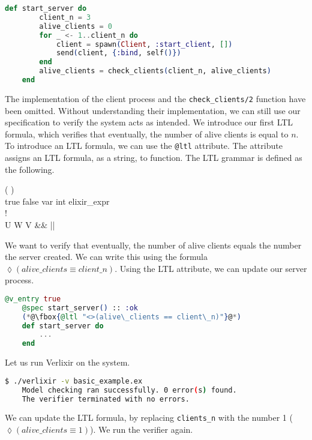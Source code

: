 \begin{lstlisting}[language=Elixir, xleftmargin=.2\linewidth]
    def start_server do
        client_n = 3
        alive_clients = 0
        for _ <- 1..client_n do
            client = spawn(Client, :start_client, [])
            send(client, {:bind, self()})
        end
        alive_clients = check_clients(client_n, alive_clients)
    end
\end{lstlisting}
The implementation of the client process and the \texttt{check\_clients/2} function have been omitted. Without understanding their implementation, we can still use our specification to verify the system acts as intended. We introduce our first LTL formula, which verifies that eventually, the number of alive clients is equal to $n$. To introduce an LTL formula, we can use the \texttt{@ltl} attribute. The attribute assigns an LTL formula, as a string, to function. The LTL grammar is defined as the following.
\begin{bnf*}
      { \bnfor (  ) \bnfor {}   \bnfor {} }\\
      {true \bnfor false \bnfor var \bnfor int \bnfor elixir\_expr}\\
      {\square \bnfor \lozenge \bnfor !}\\
      {U \bnfor W \bnfor V \bnfor \&\& \bnfor || \bnfor \rightarrow \bnfor \leftrightarrow }\\
\end{bnf*}
We want to verify that eventually, the number of alive clients equals the number the server created. We can write this using the formula $\lozenge (alive\_clients \equiv client\_n)$. Using the LTL attribute, we can update our server process.
\begin{lstlisting}[language=Elixir, xleftmargin=.3\linewidth, caption={Example LTL property}]
    @v_entry true
    @spec start_server() :: :ok
    (*@\fbox{@ltl "<>(alive\_clients == client\_n)"}@*)
    def start_server do
        ...
    end
\end{lstlisting}
Let us run Verlixir on the system.
\begin{lstlisting}[language=bash, xleftmargin=.3\linewidth]
    $ ./verlixir -v basic_example.ex
    Model checking ran successfully. 0 error(s) found.
    The verifier terminated with no errors.
\end{lstlisting}
We can update the LTL formula, by replacing \texttt{clients\_n} with the number 1 ($\lozenge (alive\_clients \equiv 1)$). We run the verifier again.
